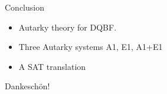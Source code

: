 \documentclass[xcolor=table	]{beamer}
\begin{document}
%  
%  
%   

\begin{frame}{Conclusion}
\begin{itemize}
\item Autarky theory for DQBF.
\item Three Autarky systems A1, E1, A1+E1
\item A SAT translation 
\end{itemize}
\vspace{1cm}
\Large
Dankeschön!
\end{frame}
\end{document}
